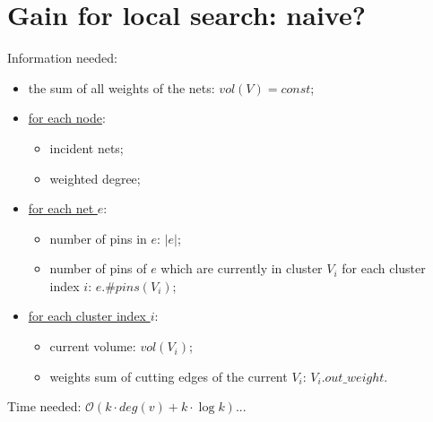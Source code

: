 \documentclass[acmsmall,nonacm,screen,review]{acmart}
\begin{document}
\section{Gain for local search: naive?}

Information needed:
\begin{itemize}
    \item 
    the sum of all weights of the nets: $vol(V) = const$;
    \item
\underline{for each node}: 
    \begin{itemize}
        \item incident nets;
        \item weighted degree;
    \end{itemize}
    \item 
\underline{for each net $e$}: 
    \begin{itemize}
        \item 
number of pins in $e$: $|e|$;
        \item 
number of pins of $e$ which are currently in cluster $V_i$ for each cluster index $i$: $e.\#pins(V_i)$;
    \end{itemize}
    \item 
\underline{for each cluster index $i$}: 
    \begin{itemize}
        \item 
current volume: $vol(V_i)$;
        \item 
weights sum of cutting edges of the current $V_i$: $V_i.out\_weight$.
    \end{itemize}
\end{itemize}

Time needed: $\mathcal{O}(k \cdot deg(v) + k \cdot \log k)$...

\medskip
\end{document}
